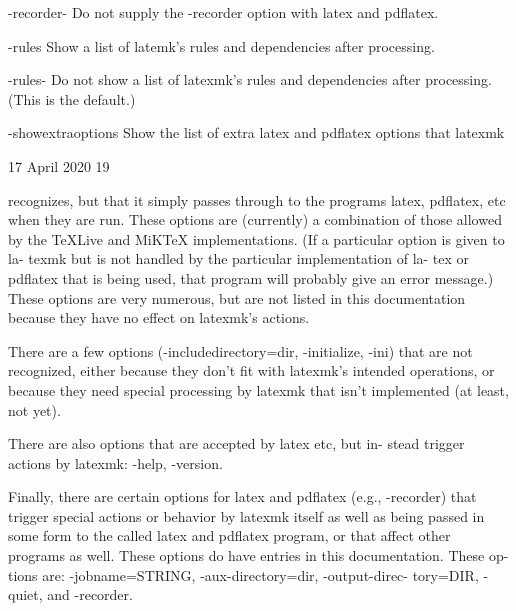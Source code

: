        -recorder-
              Do not supply the -recorder option with latex and pdflatex.


       -rules Show a list of latemk's rules and dependencies after processing.


       -rules-
              Do  not  show  a  list of latexmk's rules and dependencies after
              processing.  (This is the default.)


       -showextraoptions
              Show the list of extra latex and pdflatex options  that  latexmk



                                 17 April 2020                              19








              recognizes,  but  that  it simply passes through to the programs
              latex, pdflatex, etc  when they  are  run.   These  options  are
              (currently)  a  combination  of those allowed by the TeXLive and
              MiKTeX implementations.  (If a particular option is given to la-
              texmk but is not handled by the particular implementation of la-
              tex or pdflatex that is being used, that program  will  probably
              give  an  error  message.)  These options are very numerous, but
              are not listed in this documentation because they have no effect
              on latexmk's actions.

              There  are  a  few  options (-includedirectory=dir, -initialize,
              -ini) that are not recognized, either  because  they  don't  fit
              with latexmk's intended operations, or because they need special
              processing by latexmk that  isn't  implemented  (at  least,  not
              yet).

              There  are  also options that are accepted by latex etc, but in-
              stead trigger actions by latexmk: -help, -version.

              Finally, there are certain options for latex and pdflatex (e.g.,
              -recorder)  that  trigger special actions or behavior by latexmk
              itself as well as being passed in some form to the called  latex
              and  pdflatex  program,  or  that affect other programs as well.
              These options do have entries in this documentation.  These  op-
              tions  are:  -jobname=STRING, -aux-directory=dir, -output-direc-
              tory=DIR, -quiet, and -recorder.


